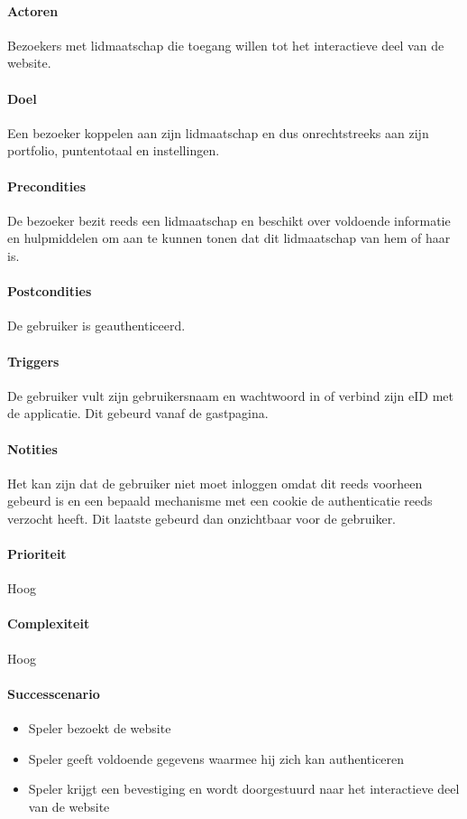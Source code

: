 \paragraph{Actoren} Bezoekers met lidmaatschap die toegang willen tot het interactieve deel van de website.
\paragraph{Doel} Een bezoeker koppelen aan zijn lidmaatschap en dus onrechtstreeks aan zijn portfolio, puntentotaal en instellingen.
\paragraph{Precondities} De bezoeker bezit reeds een lidmaatschap en beschikt over voldoende informatie en hulpmiddelen om aan te kunnen tonen dat dit lidmaatschap van hem of haar is.
\paragraph{Postcondities} De gebruiker is geauthenticeerd.
\paragraph{Triggers} De gebruiker vult zijn gebruikersnaam en wachtwoord in of verbind zijn eID met de applicatie. Dit gebeurd vanaf de gastpagina.
\paragraph{Notities} Het kan zijn dat de gebruiker niet moet inloggen omdat dit reeds voorheen gebeurd is en een bepaald mechanisme met een cookie de authenticatie reeds verzocht heeft. Dit laatste gebeurd dan onzichtbaar voor de gebruiker.
\paragraph{Prioriteit}Hoog
\paragraph{Complexiteit}Hoog
\paragraph{Successcenario}
\begin{itemize}
 \item Speler bezoekt de website
 \item Speler geeft voldoende gegevens waarmee hij zich kan authenticeren
 \item \label{def:inloggen:bevestiging} Speler krijgt een bevestiging en wordt doorgestuurd naar het interactieve deel van de website
\end{itemize}
